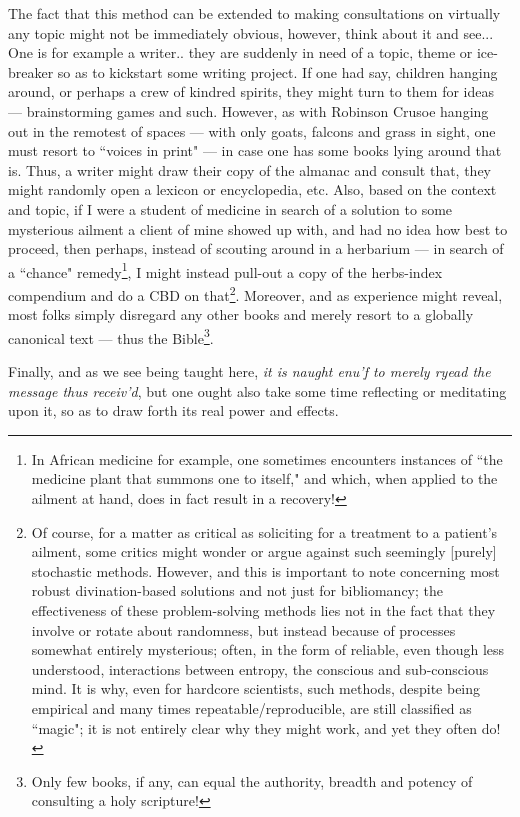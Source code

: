 \documentclass[a4paper]{article}
\begin{document}
The fact that this method can be extended to making consultations on virtually any topic might not be immediately obvious, however, think about it and see... One is for example a writer.. they are suddenly in need of a topic, theme or ice-breaker so as to kickstart some writing project. If one had say, children hanging around, or perhaps a crew of kindred spirits, they might turn to them for ideas --- brainstorming games and such. However, as with Robinson Crusoe hanging out in the remotest of spaces --- with only goats, falcons and grass in sight, one must resort to ``voices in print" --- in case one has some books lying around that is. Thus, a writer might draw their copy of the almanac and consult that, they might randomly open a lexicon or encyclopedia, etc. Also, based on the context and topic, if I were a student of medicine in search of a solution to some mysterious ailment a client of mine showed up with, and had no idea how best to proceed, then perhaps, instead of scouting around in a herbarium --- in search of a ``chance" remedy\footnote{In African medicine for example, one sometimes encounters instances of ``the medicine plant that summons one to itself," and which, when applied to the ailment at hand, does in fact result in a recovery!}, I might instead pull-out a copy of the herbs-index compendium and do a CBD on that\footnote{Of course, for a matter as critical as soliciting for a treatment to a patient's ailment, some critics might wonder or argue against such seemingly [purely] stochastic methods. However, and this is important to note concerning most robust divination-based solutions and not just for bibliomancy; the effectiveness of these problem-solving methods lies not in the fact that they involve or rotate about randomness, but instead because of processes somewhat entirely mysterious; often, in the form of reliable, even though less understood, interactions between entropy, the conscious and sub-conscious mind. It is why, even for hardcore scientists, such methods, despite being empirical and many times repeatable/reproducible, are still classified as ``magic"; it is not entirely clear why they might work, and yet they often do!}. Moreover, and as experience might reveal, most folks simply disregard any other books and merely resort to a globally canonical text --- thus the Bible\footnote{Only few books, if any, can equal the authority, breadth and potency of consulting a holy scripture!}.

Finally, and as we see being taught here, \textit{it is naught enu'f to merely ryead the message thus receiv'd}, but one ought also take some time reflecting or meditating upon it, so as to draw forth its real power and effects.
\end{document}
